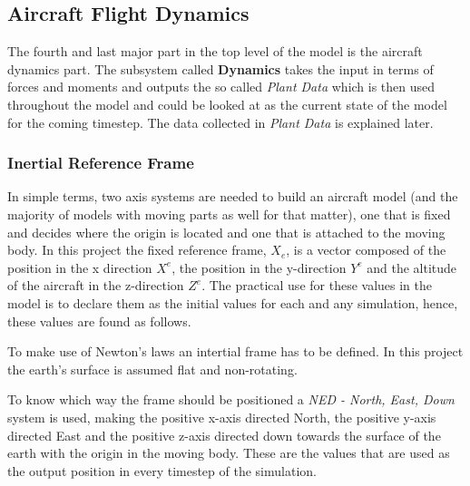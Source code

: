 \subsection{Aircraft Flight Dynamics}

The fourth and last major part in the top level of the model is the aircraft dynamics part. The subsystem called \textbf{Dynamics} takes the input in terms of forces and moments and outputs the so called \textit{Plant Data} which is then used throughout the model and could be looked at as the current state of the model for the coming timestep. The data collected in \textit{Plant Data} is explained later.

\subsubsection{Inertial Reference Frame}

In simple terms, two axis systems are needed to build an aircraft model (and the majority of models with moving parts as well for that matter), one that is fixed and decides where the origin is located and one that is attached to the moving body. In this project the fixed reference frame, \textbf{$X_e$}, is a vector composed of the position in the x direction $X^e$, the position in the y-direction $Y^e$ and the altitude of the aircraft in the z-direction $Z^e$. The practical use for these values in the model is to declare them as the initial values for each and any simulation, hence, these values are found as follows.



%
%
To make use of Newton's laws an intertial frame has to be defined. In this project the earth's surface is assumed flat and non-rotating.
%

To know which way the frame should be positioned a \textit{NED - North, East, Down} system is used, making the positive x-axis directed North, the positive y-axis directed East and the positive z-axis directed down towards the surface of the earth with the origin in the moving body. These are the values that are used as the output position in every timestep of the simulation.

